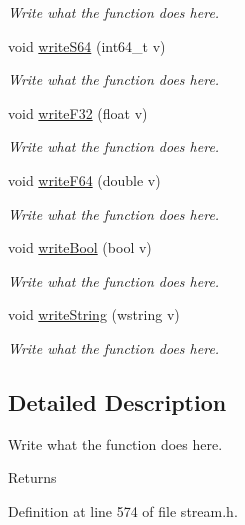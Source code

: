 \begin{DoxyCompactItemize}
\begin{DoxyCompactList}\small\item\em Write what the function does here. \end{DoxyCompactList}\item 
void \hyperlink{classWriter_a293a714331946c20921f8bdcaaf8fb45}{write\+S64} (int64\+\_\+t v)
\begin{DoxyCompactList}\small\item\em Write what the function does here. \end{DoxyCompactList}\item 
void \hyperlink{classWriter_a8816378c8b285c9c32e9ce852321bea6}{write\+F32} (float v)
\begin{DoxyCompactList}\small\item\em Write what the function does here. \end{DoxyCompactList}\item 
void \hyperlink{classWriter_ac3bd2e371437c63ff9a9d61be5578b7c}{write\+F64} (double v)
\begin{DoxyCompactList}\small\item\em Write what the function does here. \end{DoxyCompactList}\item 
void \hyperlink{classWriter_a473689a8f2ce7c1689db055fc7030773}{write\+Bool} (bool v)
\begin{DoxyCompactList}\small\item\em Write what the function does here. \end{DoxyCompactList}\item 
void \hyperlink{classWriter_aaab90e47e77581ec8aaab248c26e726e}{write\+String} (wstring v)
\begin{DoxyCompactList}\small\item\em Write what the function does here. \end{DoxyCompactList}\end{DoxyCompactItemize}


\subsection{Detailed Description}
Write what the function does here. 

\begin{DoxyReturn}{Returns}

\end{DoxyReturn}


Definition at line 574 of file stream.\+h.



